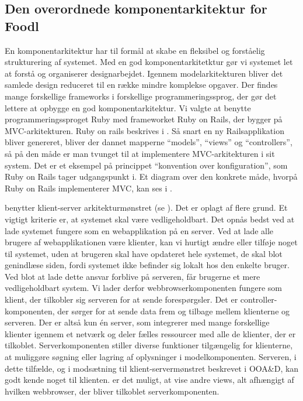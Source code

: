 \subsection{Den overordnede komponentarkitektur for Foodl}
\label{sec:overordnetkomponent}
En komponentarkitektur har til formål at skabe en fleksibel og forståelig strukturering af systemet. Med en god komponentarkitetktur gør vi systemet let at forstå og organiserer designarbejdet. Igennem modelarkitekturen bliver det samlede design reduceret til en række mindre komplekse opgaver\cite[s.~185]{ooad}. Der findes mange forskellige frameworks i forskellige programmeringssprog, der gør det lettere at opbygge en god komponentarkitektur. Vi valgte at benytte programmeringssproget Ruby med frameworket Ruby on Rails, der bygger på MVC-arkitekturen. Ruby on rails beskrives i . Så snart en ny Railsapplikation bliver genereret, bliver der dannet mapperne ``models'', ``views'' og ``controllers'', så på den måde er man tvunget til at implementere MVC-arkitekturen i sit system. Det er et eksempel på princippet ``konvention over konfiguration'', som Ruby on Rails tager udgangspunkt i. Et diagram over den konkrete måde, hvorpå Ruby on Rails implementerer MVC, kan ses i .

\Foodl{} benytter klient-server arkitekturmønstret (se ). Det er oplagt af flere grund. Et vigtigt kriterie er, at systemet skal være vedligeholdbart. Det opnås bedst ved at lade systemet fungere som en webapplikation på en server. Ved at lade alle brugere af webapplikationen være klienter, kan vi hurtigt ændre eller tilføje noget til systemet, uden at brugeren skal have opdateret hele systemet, de skal blot genindlæse siden, fordi systemet ikke befinder sig lokalt hos den enkelte bruger. Ved blot at lade dette ansvar forblive på serveren, får brugerne et mere vedligeholdbart system. Vi lader derfor webbrowserkomponenten fungere som klient, der tilkobler sig serveren for at sende forespørgsler. Det er controller-komponenten, der sørger for at sende data frem og tilbage mellem klienterne og serveren. Der er altså kun én server, som integrerer med mange forskellige klienter igennem et netværk og deler fælles ressourcer med alle de klienter, der er tilkoblet. Serverkomponenten stiller diverse funktioner tilgængelig for klienterne, \fx at muliggøre søgning eller lagring af oplysninger i modelkomponenten. Serveren, i dette tilfælde, og i modsætning til klient-servermønstret beskrevet i OOA\&D\cite{ooad}, kan godt kende noget til klienten. \Fx er det muligt, at vise andre views, alt afhængigt af hvilken webbrowser, der bliver tilkoblet serverkomponenten.

